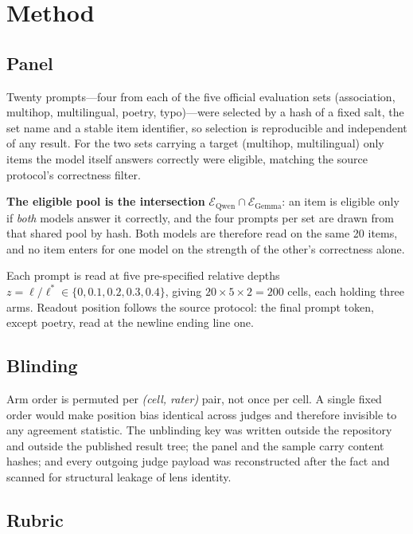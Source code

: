 \documentclass[11pt]{article}
\begin{document}
\section{Method}

\subsection{Panel}

Twenty prompts---four from each of the five official evaluation sets
(association, multihop, multilingual, poetry, typo)---were selected by a hash
of a fixed salt, the set name and a stable item identifier, so selection is
reproducible and independent of any result. For the two sets carrying a target
(multihop, multilingual) only items the model itself answers correctly were
eligible, matching the source protocol's correctness filter.

\textbf{The eligible pool is the intersection}
$\mathcal{E}_{\text{Qwen}} \cap \mathcal{E}_{\text{Gemma}}$: an item is eligible
only if \emph{both} models answer it correctly, and the four prompts per set are
drawn from that shared pool by hash. Both models are therefore read on the same
20 items, and no item enters for one model on the strength of the other's
correctness alone.

Each prompt is read at five pre-specified relative depths
$z = \ell / \ell^{*} \in \{0, 0.1, 0.2, 0.3, 0.4\}$, giving
$20 \times 5 \times 2 = 200$ cells, each holding three arms. Readout position
follows the source protocol: the final prompt token, except poetry, read at the
newline ending line one.

\subsection{Blinding}

Arm order is permuted per \emph{(cell, rater)} pair, not once per cell. A single
fixed order would make position bias identical across judges and therefore
invisible to any agreement statistic. The unblinding key was written outside the
repository and outside the published result tree; the panel and the sample carry
content hashes; and every outgoing judge payload was reconstructed after the
fact and scanned for structural leakage of lens identity.

\subsection{Rubric}
\end{document}
